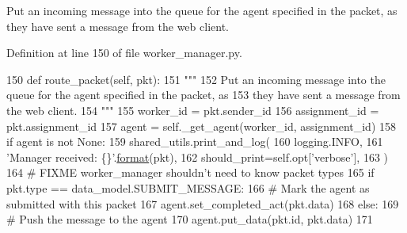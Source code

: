 \begin{DoxyVerb}Put an incoming message into the queue for the agent specified in the packet, as
they have sent a message from the web client.
\end{DoxyVerb}
 

Definition at line 150 of file worker\+\_\+manager.\+py.


\begin{DoxyCode}
150     \textcolor{keyword}{def }route\_packet(self, pkt):
151         \textcolor{stringliteral}{"""}
152 \textcolor{stringliteral}{        Put an incoming message into the queue for the agent specified in the packet, as}
153 \textcolor{stringliteral}{        they have sent a message from the web client.}
154 \textcolor{stringliteral}{        """}
155         worker\_id = pkt.sender\_id
156         assignment\_id = pkt.assignment\_id
157         agent = self.\_get\_agent(worker\_id, assignment\_id)
158         \textcolor{keywordflow}{if} agent \textcolor{keywordflow}{is} \textcolor{keywordflow}{not} \textcolor{keywordtype}{None}:
159             shared\_utils.print\_and\_log(
160                 logging.INFO,
161                 \textcolor{stringliteral}{'Manager received: \{\}'}.\hyperlink{namespaceparlai_1_1chat__service_1_1services_1_1messenger_1_1shared__utils_a32e2e2022b824fbaf80c747160b52a76}{format}(pkt),
162                 should\_print=self.opt[\textcolor{stringliteral}{'verbose'}],
163             )
164             \textcolor{comment}{# FIXME worker\_manager shouldn't need to know packet types}
165             \textcolor{keywordflow}{if} pkt.type == data\_model.SUBMIT\_MESSAGE:
166                 \textcolor{comment}{# Mark the agent as submitted with this packet}
167                 agent.set\_completed\_act(pkt.data)
168             \textcolor{keywordflow}{else}:
169                 \textcolor{comment}{# Push the message to the agent}
170                 agent.put\_data(pkt.id, pkt.data)
171 
\end{DoxyCode}
\mbox{\label{classparlai_1_1mturk_1_1core_1_1dev_1_1worker__manager_1_1WorkerManager_a4ef70d1871be031e2260ac6948fd3dba}} 
